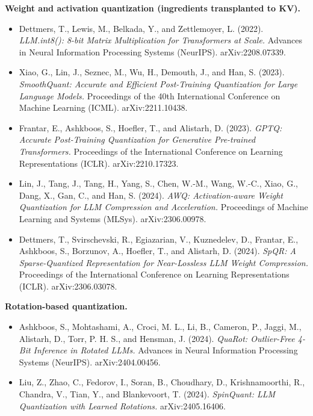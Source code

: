 \documentclass[
]{article}
\providecommand{\tightlist}{%
  \setlength{\itemsep}{0pt}\setlength{\parskip}{0pt}}
\begin{document}
\textbf{Weight and activation quantization (ingredients transplanted to
KV).}

\begin{itemize}
\tightlist
\item
  Dettmers, T., Lewis, M., Belkada, Y., and Zettlemoyer, L. (2022).
  \emph{LLM.int8(): 8-bit Matrix Multiplication for Transformers at
  Scale.} Advances in Neural Information Processing Systems (NeurIPS).
  arXiv:2208.07339.
\item
  Xiao, G., Lin, J., Seznec, M., Wu, H., Demouth, J., and Han, S.
  (2023). \emph{SmoothQuant: Accurate and Efficient Post-Training
  Quantization for Large Language Models.} Proceedings of the 40th
  International Conference on Machine Learning (ICML). arXiv:2211.10438.
\item
  Frantar, E., Ashkboos, S., Hoefler, T., and Alistarh, D. (2023).
  \emph{GPTQ: Accurate Post-Training Quantization for Generative
  Pre-trained Transformers.} Proceedings of the International Conference
  on Learning Representations (ICLR). arXiv:2210.17323.
\item
  Lin, J., Tang, J., Tang, H., Yang, S., Chen, W.-M., Wang, W.-C., Xiao,
  G., Dang, X., Gan, C., and Han, S. (2024). \emph{AWQ: Activation-aware
  Weight Quantization for LLM Compression and Acceleration.} Proceedings
  of Machine Learning and Systems (MLSys). arXiv:2306.00978.
\item
  Dettmers, T., Svirschevski, R., Egiazarian, V., Kuznedelev, D.,
  Frantar, E., Ashkboos, S., Borzunov, A., Hoefler, T., and Alistarh, D.
  (2024). \emph{SpQR: A Sparse-Quantized Representation for
  Near-Lossless LLM Weight Compression.} Proceedings of the
  International Conference on Learning Representations (ICLR).
  arXiv:2306.03078.
\end{itemize}

\textbf{Rotation-based quantization.}

\begin{itemize}
\tightlist
\item
  Ashkboos, S., Mohtashami, A., Croci, M. L., Li, B., Cameron, P.,
  Jaggi, M., Alistarh, D., Torr, P. H. S., and Hensman, J. (2024).
  \emph{QuaRot: Outlier-Free 4-Bit Inference in Rotated LLMs.} Advances
  in Neural Information Processing Systems (NeurIPS). arXiv:2404.00456.
\item
  Liu, Z., Zhao, C., Fedorov, I., Soran, B., Choudhary, D.,
  Krishnamoorthi, R., Chandra, V., Tian, Y., and Blankevoort, T. (2024).
  \emph{SpinQuant: LLM Quantization with Learned Rotations.}
  arXiv:2405.16406.
\end{itemize}
\end{document}
